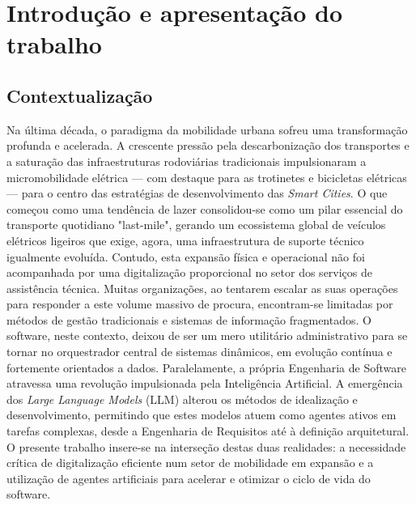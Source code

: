 \documentclass[a4paper,12pt]{scrreprt}
\begin{document}
\pagebreak


\renewcommand{\contentsname}{Índice}
\tableofcontents
\pagebreak
\listoffigures
\pagebreak
\listoftables
\pagebreak


\chapter{Introdução e apresentação do trabalho}

\section{Contextualização}
Na última década, o paradigma da mobilidade urbana sofreu uma transformação profunda e acelerada. A crescente pressão pela descarbonização dos transportes e a saturação das infraestruturas rodoviárias tradicionais impulsionaram a micromobilidade elétrica — com destaque para as trotinetes e bicicletas elétricas — para o centro das estratégias de desenvolvimento das \textit{Smart Cities}. O que começou como uma tendência de lazer consolidou-se como um pilar essencial do transporte quotidiano "last-mile", gerando um ecossistema global de veículos elétricos ligeiros que exige, agora, uma infraestrutura de suporte técnico igualmente evoluída. Contudo, esta expansão física e operacional não foi acompanhada por uma digitalização proporcional no setor dos serviços de assistência técnica. Muitas organizações, ao tentarem escalar as suas operações para responder a este volume massivo de procura, encontram-se limitadas por métodos de gestão tradicionais e sistemas de informação fragmentados. O software, neste contexto, deixou de ser um mero utilitário administrativo para se tornar no orquestrador central de sistemas dinâmicos, em evolução contínua e fortemente orientados a dados. Paralelamente, a própria Engenharia de Software atravessa uma revolução impulsionada pela Inteligência Artificial. A emergência dos \textit{Large Language Models} (LLM) alterou os métodos de idealização e desenvolvimento, permitindo que estes modelos atuem como agentes ativos em tarefas complexas, desde a Engenharia de Requisitos até à definição arquitetural. O presente trabalho insere-se na interseção destas duas realidades: a necessidade crítica de digitalização eficiente num setor de mobilidade em expansão e a utilização de agentes artificiais para acelerar e otimizar o ciclo de vida do software. 
\end{document}
